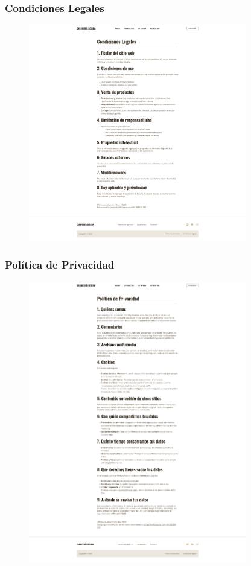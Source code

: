 \documentclass[a4paper]{article}
\begin{document}
\subsubsection{Condiciones Legales}
\begin{figure}[H]
    \centering
    \includegraphics[width=0.85\textwidth]{images/legal.png}
\end{figure}

\subsubsection{Política de Privacidad}
\begin{figure}[H]
    \centering
    \includegraphics[width=0.85\textwidth]{images/privacy-policy.png}
\end{figure}
\end{document}
